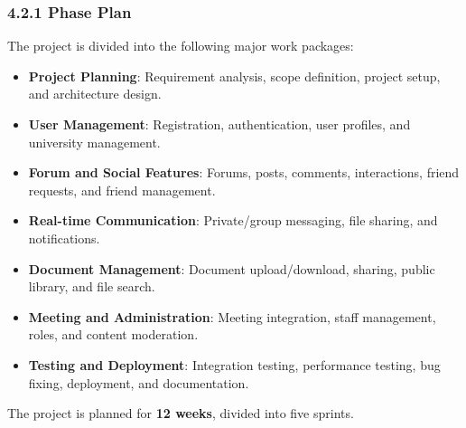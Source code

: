 \documentclass[12pt]{article}
\renewcommand{\baselinestretch}{1.5}
\begin{document}
\subsubsection*{4.2.1 Phase Plan}
\par\medskip
The project is divided into the following major work packages:
\par\medskip
\begin{itemize}
\item \textbf{Project Planning}: Requirement analysis, scope definition, project setup, and architecture design.
\par
\item \textbf{User Management}: Registration, authentication, user profiles, and university management.
\par
\item \textbf{Forum and Social Features}: Forums, posts, comments, interactions, friend requests, and friend management.
\par
\item \textbf{Real-time Communication}: Private/\allowbreak{}group messaging, file sharing, and notifications.
\par
\item \textbf{Document Management}: Document upload/\allowbreak{}download, sharing, public library, and file search.
\par
\item \textbf{Meeting and Administration}: Meeting integration, staff management, roles, and content moderation.
\par
\item \textbf{Testing and Deployment}: Integration testing, performance testing, bug fixing, deployment, and documentation.
\par
\end{itemize}
The project is planned for \textbf{12 weeks}, divided into five sprints.
\par\medskip
\begingroup
\scriptsize
\renewcommand{\baselinestretch}{1.0}\selectfont
\renewcommand{\arraystretch}{1.15}
\setlength{\tabcolsep}{4pt}
\end{document}
